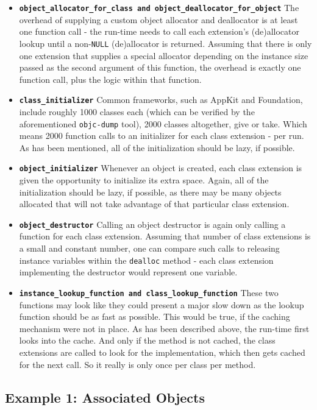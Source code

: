\begin{itemize}
  \item{\bf{\tt{object\_allocator\_for\_class} and \tt{object\_deallocator\_for\_object}}} The overhead of supplying a custom object allocator and deallocator is at least one function call - the run-time needs to call each extension's (de)allocator lookup until a non-\verb=NULL= (de)allocator is returned. Assuming that there is only one extension that supplies a special allocator depending on the instance size passed as the second argument of this function, the overhead is exactly one function call, plus the logic within that function.
  \item{\bf{\tt{class\_initializer}}} Common frameworks, such as AppKit and Foundation, include roughly 1000 classes each (which can be verified by the aforementioned \verb=objc-dump= tool), 2000 classes altogether, give or take. Which means 2000 function calls to an initializer for each class extension - per run. As has been mentioned, all of the initialization should be lazy, if possible.
  \item{\bf{\tt{object\_initializer}}} Whenever an object is created, each class extension is given the opportunity to initialize its extra space. Again, all of the initialization should be lazy, if possible, as there may be many objects allocated that will not take advantage of that particular class extension.
  \item{\bf{\tt{object\_destructor}}} Calling an object destructor is again only calling a function for each class extension. Assuming that number of class extensions is a small and constant number, one can compare such calls to releasing instance variables within the \texttt{dealloc} method - each class extension implementing the destructor would represent one variable.
  \item{\bf{\tt{instance\_lookup\_function} and \tt{class\_lookup\_function}}} These two functions may look like they could present a major slow down as the lookup function should be as fast as possible. This would be true, if the caching mechanism were not in place. As has been described above, the run-time first looks into the cache. And only if the method is not cached, the class extensions are called to look for the implementation, which then gets cached for the next call. So it really is only once per class per method.
\end{itemize}

\subsection{Example 1: Associated Objects}\label{associated_objects_example_1}

